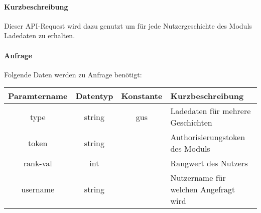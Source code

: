 \paragraph{Kurzbeschreibung}Dieser API-Request wird dazu genutzt um für jede Nutzergeschichte des Moduls Ladedaten zu erhalten.
\paragraph{Anfrage}Folgende Daten werden zu Anfrage benötigt:
\begin{table}[H]
	\begin{tabular}{|c|c|c|p{6.5cm}|}
		\hline
		\textbf{Paramtername} & \textbf{Datentyp} & \textbf{Konstante} & \textbf{Kurzbeschreibung}                                                                                               \\ \hline
		type                & string            & gus                & Ladedaten für mehrere Geschichten \\ \hline
		token               & string            &                    & Authorisierungstoken des Moduls \\ \hline
		rank-val            & int               &                    & Rangwert des Nutzers \\ \hline
		username            & string            &                    & Nutzername für welchen Angefragt wird \\ \hline
	\end{tabular}
\end{table}
